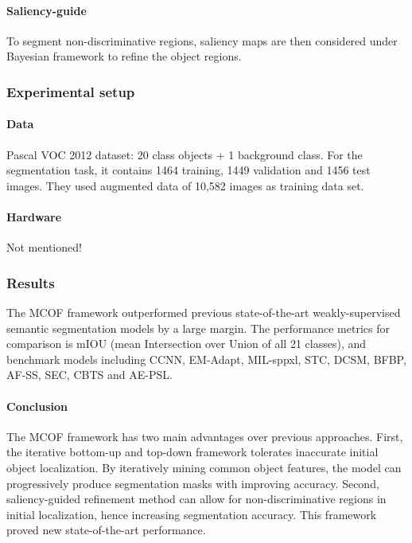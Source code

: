\documentclass{article}
\begin{document}
\paragraph{Saliency-guide}
To segment non-discriminative regions, saliency maps are then considered under Bayesian framework to refine the object regions. 

\subsubsection{Experimental setup}

\paragraph{Data}
Pascal VOC 2012 dataset: 20 class objects + 1 background class. For the segmentation task, it contains 1464 training, 1449 validation and 1456 test images. They used augmented data of 10,582 images as training data set.

\paragraph{Hardware}
Not mentioned!

\subsubsection{Results}
The MCOF framework outperformed previous state-of-the-art weakly-supervised semantic segmentation models by a large margin. The performance metrics for comparison is mIOU (mean Intersection over Union of all 21 classes), and benchmark models including CCNN, EM-Adapt, MIL-sppxl, STC, DCSM, BFBP, AF-SS, SEC, CBTS and AE-PSL.

\paragraph{Conclusion}
The MCOF framework has two main advantages over previous approaches. First, the iterative bottom-up and top-down framework tolerates inaccurate initial object localization. By iteratively mining common object features, the model can progressively produce segmentation masks with improving accuracy. Second, saliency-guided refinement method can allow for non-discriminative regions in initial localization, hence increasing segmentation accuracy. This framework proved new state-of-the-art performance.

\newpage



\end{document}
